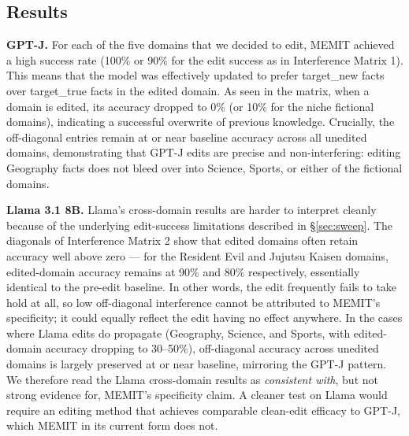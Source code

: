 \documentclass[11pt]{article}
\begin{document}
\subsection{Results}
\noindent \textbf{GPT-J.} For each of the five domains that we decided to edit, MEMIT achieved a high success rate (100\% or 90\% for the edit success as in Interference Matrix 1). This means that the model was effectively updated to prefer target\_new facts over target\_true facts in the edited domain. As seen in the matrix, when a domain is edited, its accuracy dropped to 0\% (or 10\% for the niche fictional domains), indicating a successful overwrite of previous knowledge. Crucially, the off-diagonal entries remain at or near baseline accuracy across all unedited domains, demonstrating that GPT-J edits are precise and non-interfering: editing Geography facts does not bleed over into Science, Sports, or either of the fictional domains.

\vspace{3.5mm}
\noindent \textbf{Llama 3.1 8B.} Llama's cross-domain results are harder to interpret cleanly because of the underlying edit-success limitations described in \S\ref{sec:sweep}. The diagonals of Interference Matrix 2 show that edited domains often retain accuracy well above zero --- for the Resident Evil and Jujutsu Kaisen domains, edited-domain accuracy remains at 90\% and 80\% respectively, essentially identical to the pre-edit baseline. In other words, the edit frequently fails to take hold at all, so low off-diagonal interference cannot be attributed to MEMIT's specificity; it could equally reflect the edit having no effect anywhere. In the cases where Llama edits do propagate (Geography, Science, and Sports, with edited-domain accuracy dropping to 30--50\%), off-diagonal accuracy across unedited domains is largely preserved at or near baseline, mirroring the GPT-J pattern. We therefore read the Llama cross-domain results as \emph{consistent with}, but not strong evidence for, MEMIT's specificity claim. A cleaner test on Llama would require an editing method that achieves comparable clean-edit efficacy to GPT-J, which MEMIT in its current form does not.
\end{document}
